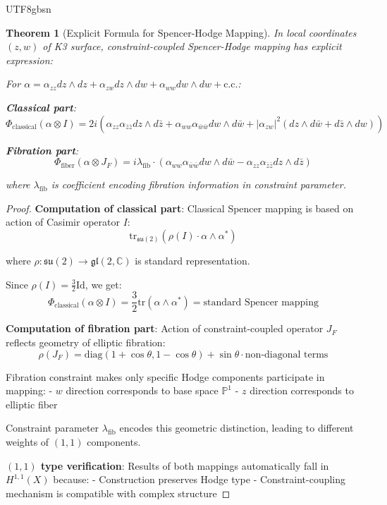 \documentclass[a4paper,12pt]{extarticle}
\newtheorem{theorem}{Theorem}[section]
\theoremstyle{definition}
\begin{document}
\begin{CJK}{UTF8}{gbsn}
\begin{theorem}[Explicit Formula for Spencer-Hodge Mapping]
\label{thm:explicit_spencer_hodge_formula}
In local coordinates $(z, w)$ of K3 surface, constraint-coupled Spencer-Hodge mapping has explicit expression:

For $\alpha = \alpha_{zz} dz \wedge dz + \alpha_{zw} dz \wedge dw + \alpha_{ww} dw \wedge dw + \text{c.c.}$:

\textbf{Classical part}:
$$\Phi_{\text{classical}}(\alpha \otimes I) = 2i(\alpha_{zz} \alpha_{\bar{z}\bar{z}} dz \wedge d\bar{z} + \alpha_{ww} \alpha_{\bar{w}\bar{w}} dw \wedge d\bar{w} + |\alpha_{zw}|^2 (dz \wedge d\bar{w} + d\bar{z} \wedge dw))$$

\textbf{Fibration part}:
$$\Phi_{\text{fiber}}(\alpha \otimes J_F) = i \lambda_{\text{fib}} \cdot (\alpha_{ww} \alpha_{\bar{w}\bar{w}} dw \wedge d\bar{w} - \alpha_{zz} \alpha_{\bar{z}\bar{z}} dz \wedge d\bar{z})$$

where $\lambda_{\text{fib}}$ is coefficient encoding fibration information in constraint parameter.
\end{theorem}

\begin{proof}
\textbf{Computation of classical part}:
Classical Spencer mapping is based on action of Casimir operator $I$:
$$\text{tr}_{\mathfrak{su}(2)}(\rho(I) \cdot \alpha \wedge \alpha^*)$$

where $\rho: \mathfrak{su}(2) \to \mathfrak{gl}(2, \mathbb{C})$ is standard representation.

Since $\rho(I) = \frac{3}{2} \text{Id}$, we get:
$$\Phi_{\text{classical}}(\alpha \otimes I) = \frac{3}{2} \text{tr}(\alpha \wedge \alpha^*) = \text{standard Spencer mapping}$$

\textbf{Computation of fibration part}:
Action of constraint-coupled operator $J_F$ reflects geometry of elliptic fibration:
$$\rho(J_F) = \text{diag}(1 + \cos\theta, 1 - \cos\theta) + \sin\theta \cdot \text{non-diagonal terms}$$

Fibration constraint makes only specific Hodge components participate in mapping:
- $w$ direction corresponds to base space $\mathbb{P}^1$
- $z$ direction corresponds to elliptic fiber

Constraint parameter $\lambda_{\text{fib}}$ encodes this geometric distinction, leading to different weights of $(1,1)$ components.

\textbf{$(1,1)$ type verification}:
Results of both mappings automatically fall in $H^{1,1}(X)$ because:
- Construction preserves Hodge type
- Constraint-coupling mechanism is compatible with complex structure
\end{proof}


\end{CJK}
\end{document}
